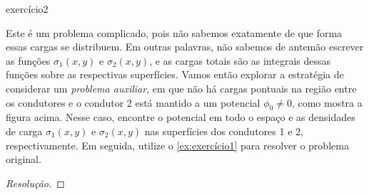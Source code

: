 \begin{exercício}{}{exercício2}
\begin{center}
    \end{center}
    Este é um problema complicado, pois não sabemos exatamente de que forma essas cargas se distribuem. Em outras palavras, não sabemos de antemão escrever as funções \(\sigma_1(x,y)\) e \(\sigma_2(x,y)\), e as cargas totais são as integrais dessas funções sobre as respectivas superfícies. Vamos então explorar a estratégia de considerar um \emph{problema auxiliar}, em que não há cargas pontuais na região entre os condutores e o condutor 2 está mantido a um potencial \(\phi_0 \neq 0\), como mostra a figura acima. Nesse caso, encontre o potencial em todo o espaço e as densidades de carga \(\sigma_1(x,y)\) e \(\sigma_2(x,y)\) nas superfícies dos condutores 1 e 2, respectivamente. Em seguida, utilize o \cref{ex:exercício1} para resolver o problema original.
\end{exercício}
\begin{proof}[Resolução]

\end{proof}
